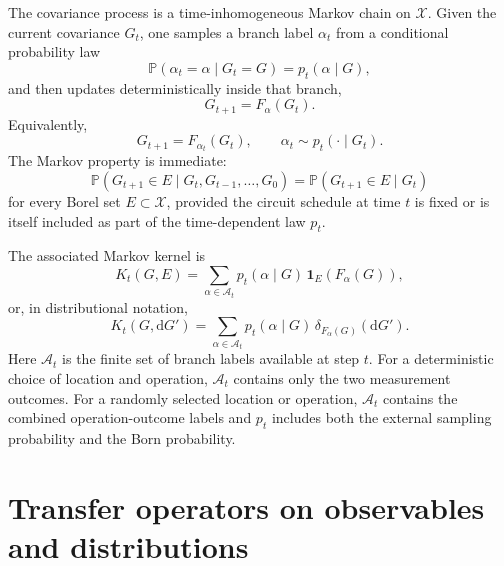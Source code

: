\documentclass[aps,preprint,onecolumn,nofootinbib,superscriptaddress]{revtex4-2}
\newcommand{\Prob}{\mathbb{P}}
\newcommand{\dd}{\mathrm{d}}
\newcommand{\cA}{\mathcal{A}}
\newcommand{\cX}{\mathcal{X}}
\theoremstyle{definition}
\theoremstyle{plain}
\begin{document}
The covariance process is a time-inhomogeneous Markov chain on \(\cX\). Given
the current covariance \(G_t\), one samples a branch label \(\alpha_t\) from a
conditional probability law
\begin{equation}
  \Prob(\alpha_t=\alpha\mid G_t=G)=p_t(\alpha\mid G),
\end{equation}
and then updates deterministically inside that branch,
\begin{equation}
  G_{t+1}=F_\alpha(G_t).
  \label{eq:discrete-process}
\end{equation}
Equivalently,
\begin{equation}
  G_{t+1}=F_{\alpha_t}(G_t),
  \qquad
  \alpha_t\sim p_t(\cdot\mid G_t).
\end{equation}
The Markov property is immediate:
\begin{equation}
  \Prob(G_{t+1}\in E\mid G_t,G_{t-1},\ldots,G_0)
  =
  \Prob(G_{t+1}\in E\mid G_t)
\end{equation}
for every Borel set \(E\subset\cX\), provided the circuit schedule at time \(t\)
is fixed or is itself included as part of the time-dependent law \(p_t\).

The associated Markov kernel is
\begin{equation}
  K_t(G,E)
  =
  \sum_{\alpha\in\cA_t}
  p_t(\alpha\mid G)\,
  \bm{1}_E\!\left(F_\alpha(G)\right),
  \label{eq:markov-kernel}
\end{equation}
or, in distributional notation,
\begin{equation}
  K_t(G,\dd G')
  =
  \sum_{\alpha\in\cA_t}
  p_t(\alpha\mid G)\,
  \delta_{F_\alpha(G)}(\dd G').
  \label{eq:kernel-delta}
\end{equation}
Here \(\cA_t\) is the finite set of branch labels available at step \(t\). For a
deterministic choice of location and operation, \(\cA_t\) contains only the two
measurement outcomes. For a randomly selected location or operation, \(\cA_t\)
contains the combined operation-outcome labels and \(p_t\) includes both the
external sampling probability and the Born probability.

\section{Transfer operators on observables and distributions}
\end{document}
